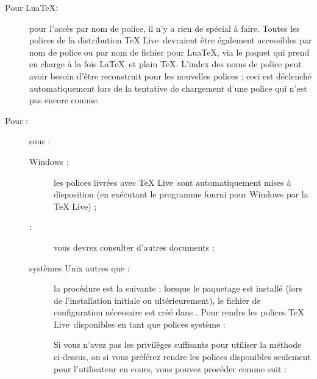 \documentclass[german, english, french, 12pt]{article}
\renewcommand{\TL}{\TeX{} Live\xspace}%
\begin{document}
\begin{description}
\item[Pour Lua\TeX :] pour l'accès par nom de police, il n'y a rien de spécial
  à faire. Toutes les polices de la distribution \TL\ devraient être également
  accessibles par nom de police ou par nom de fichier pour Lua\TeX, via le
  paquet  qui prend en charge à la fois \LaTeX\ et plain
  \TeX{}. L'index des noms de police  peut avoir besoin
  d'être reconstruit pour les nouvelles polices ; ceci est déclenché
  automatiquement lors de la tentative de chargement d'une police qui n'est pas
  encore connue.
\item[Pour \XeTeX :] sous :
  \begin{description}
  \item[Windows :] les polices livrées avec \TL\ sont automatiquement mises
    à disposition (en exécutant le programme  fourni pour
    Windows par la \TL) ;
  \item[\macOS{} :] vous devrez consulter d'autres documents ;
  \item[systèmes Unix autres que \macOS{} :] la procédure est la suivante :
    lorsque le paquetage  est installé (lors de l'installation
    initiale ou ultérieurement), le fichier de configuration nécessaire est créé
    dans . Pour rendre
    les polices \TL\ disponibles en tant que polices système :
    Si vous n'avez pas les privilèges suffisants pour utiliser la méthode
    ci-dessus, ou si vous préférez rendre les polices disponibles seulement pour
    l'utilisateur en cours, vous pouvez procéder comme suit :
  \end{description}
\end{description}
\end{document}
